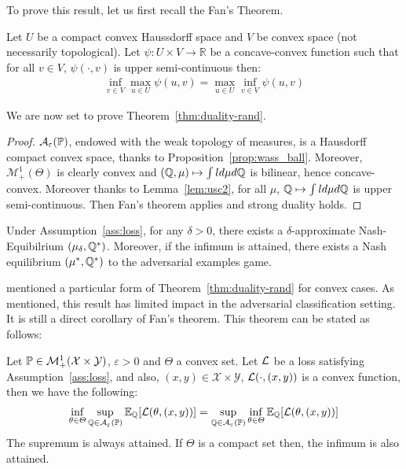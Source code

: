 To prove this result, let us first recall the Fan's Theorem.

\begin{thm}
Let $U$ be a compact convex Haussdorff space and $V$ be convex space (not necessarily topological). Let  $\psi:U\times V\to \mathbb{R}$ be a concave-convex function such that for all $v\in V$, $\psi(\cdot,v)$ is upper semi-continuous then:
\begin{align*}
    \inf_{v\in V}    \max_{u\in U}\psi(u,v) =    \max_{u\in U} \inf_{v\in V}    \psi(u,v) 
\end{align*}
\end{thm}


We are now set to prove Theorem~\ref{thm:duality-rand}.

\begin{proof}
$\mathcal{A}_\varepsilon(\mathbb{P})$, endowed with the weak topology of measures, is a Hausdorff compact convex space, thanks to Proposition~\ref{prop:wass_ball}. Moreover, $\mathcal{M}^1_+(\Theta)$ is clearly convex and $(\mathbb{Q},\mu)\mapsto \int ld\mu d\mathbb{Q}$ is bilinear, hence concave-convex. Moreover thanks to Lemma~\ref{lem:usc2}, for all $\mu$, $\mathbb{Q}\mapsto \int ld\mu d\mathbb{Q}$ is upper semi-continuous. Then Fan's theorem applies and strong duality holds.
\end{proof}
 \begin{corollary}
\label{cor:nash-eq}
Under Assumption~\ref{ass:loss}, for any $\delta>0$, there exists a $\delta$-approximate Nash-Equibilrium $(\mu_\delta,\mathbb{Q}^*)$. Moreover, if the infimum is attained, there exists a Nash equilibrium $(\mu^*,\mathbb{Q}^*)$ to the adversarial examples game.
\end{corollary}



\cite{bose2021adversarial} mentioned a particular form of Theorem~\ref{thm:duality-rand} for convex cases. As mentioned, this result has limited impact in the adversarial classification setting. It is still a direct corollary of Fan's theorem. This theorem can be stated as follows: 
\begin{thm}Let $\mathbb{P}\in\mathcal{M}^1_+(\mathcal{X}\times\mathcal{Y})$, $\varepsilon>0$ and $\Theta$ a convex set. Let $\mathcal{L}$ be a loss satisfying Assumption~\ref{ass:loss}, and also, $(x,y)\in\mathcal{X}\times\mathcal{Y}$, $\mathcal{L}(\cdot,(x,y))$ is a convex function, then we have the following:
\begin{align*}
\inf_{\theta\in\Theta} \sup_{\QQ\in \mathcal{A}_{\varepsilon}(\PP)} \mathbb{E}_{ \QQ }\left[\loss(\theta,(x,y))\right]
=
\sup_{\QQ\in \mathcal{A}_{\varepsilon}(\PP)}\inf_{\theta\in \Theta}  \mathbb{E}_{\QQ }\left[\loss(\theta,(x,y))\right]
\end{align*}
The supremum is always attained. If $\Theta$ is a compact set then, the infimum is also attained.
\end{thm}


